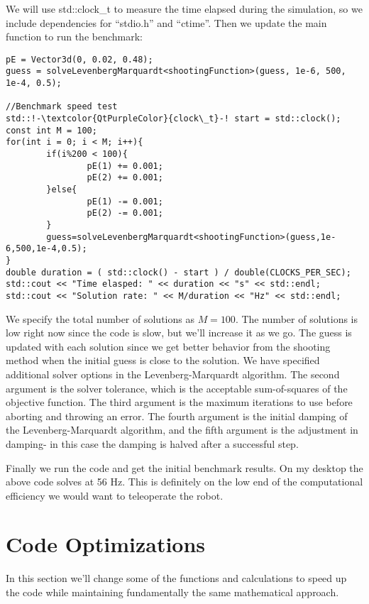 \documentclass[12pt]{article}
\begin{document}
We will use std::clock\_t to measure the time elapsed during the simulation, so we include dependencies for ``stdio.h'' and ``ctime''. Then we update the main function to run the benchmark:
\begin{lstlisting}
pE = Vector3d(0, 0.02, 0.48);
guess = solveLevenbergMarquardt<shootingFunction>(guess, 1e-6, 500, 1e-4, 0.5);

//Benchmark speed test
std::!-\textcolor{QtPurpleColor}{clock\_t}-! start = std::clock();
const int M = 100;
for(int i = 0; i < M; i++){
		if(i%200 < 100){
				pE(1) += 0.001;
				pE(2) += 0.001;
		}else{
				pE(1) -= 0.001;
				pE(2) -= 0.001;
		}
		guess=solveLevenbergMarquardt<shootingFunction>(guess,1e-6,500,1e-4,0.5);
}
double duration = ( std::clock() - start ) / double(CLOCKS_PER_SEC);
std::cout << "Time elasped: " << duration << "s" << std::endl;
std::cout << "Solution rate: " << M/duration << "Hz" << std::endl;
\end{lstlisting}
We specify the total number of solutions as $M = 100$. The number of solutions is low right now since the code is slow, but we'll increase it as we go. The guess is updated with each solution since we get better behavior from the shooting method when the initial guess is close to the solution. We have specified additional solver options in the Levenberg-Marquardt algorithm. The second argument is the solver tolerance, which is the acceptable sum-of-squares of the objective function. The third argument is the maximum iterations to use before aborting and throwing an error. The fourth argument is the initial damping of the Levenberg-Marquardt algorithm, and the fifth argument is the adjustment in damping- in this case the damping is halved after a successful step.

Finally we run the code and get the initial benchmark results. On my desktop the above code solves at 56 Hz. This is definitely on the low end of the computational efficiency we would want to teleoperate the robot.

\section{Code Optimizations}

In this section we'll change some of the functions and calculations to speed up the code while maintaining fundamentally the same mathematical approach.
\end{document}
